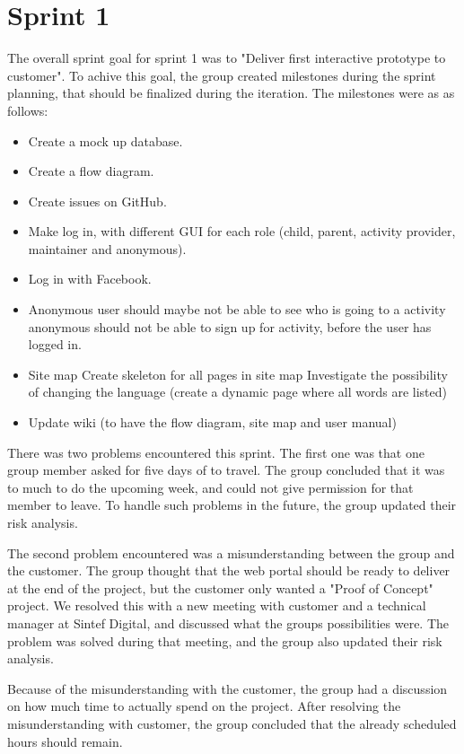 \section{Sprint 1}
The overall sprint goal for sprint 1 was to "Deliver first interactive prototype to customer". To achive this goal, the group created milestones during the sprint planning, that should be finalized during the iteration. The milestones were as as follows: 
\begin{itemize}
  \item Create a mock up database.
  \item Create a flow diagram.
  \item Create issues on GitHub.
  \item Make log in, with different GUI for each role (child, parent, activity      provider, maintainer and anonymous).
  \item Log in with Facebook.
  \item Anonymous user should maybe not be able to see who is going to a activity anonymous should not be able to sign up for activity, before the user has logged in.
  \item  Site map Create skeleton for all pages in site map Investigate the possibility of changing the language (create a dynamic page where all words are listed)
  \item Update wiki (to have the flow diagram, site map and user manual)
\end{itemize}
 
There was two problems encountered this sprint. The first one was that one group member asked for five days of to travel. The group concluded that it was to much to do the upcoming week, and could not give permission for that member to leave. To handle such problems in the future, the group updated their risk analysis. 

The second problem encountered was a misunderstanding between the group and the customer. The group thought that the web portal should be ready to deliver at the end of the project, but the customer only wanted a "Proof of Concept" project. We resolved this with a new meeting with customer and a technical manager at Sintef Digital, and discussed what the groups possibilities were. The problem was solved during that meeting, and the group also updated their risk analysis.

Because of the misunderstanding with the customer, the group had a discussion on how much time to actually spend on the project. After resolving the misunderstanding with customer, the group concluded that the already scheduled hours should remain.


